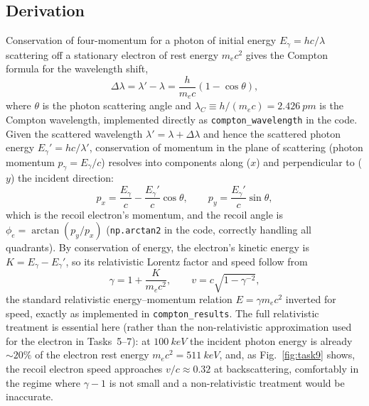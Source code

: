 \documentclass[11pt]{article}
\begin{document}
\subsection{Derivation}
Conservation of four-momentum for a photon of initial energy $E_\gamma=hc/\lambda$ scattering off a stationary electron of rest energy $m_ec^2$ gives the Compton formula for the wavelength shift,
\begin{equation}
\Delta\lambda = \lambda' - \lambda = \frac{h}{m_ec}(1-\cos\theta), \label{eq:compton}
\end{equation}
where $\theta$ is the photon scattering angle and $\lambda_C\equiv h/(m_ec)=\SI{2.426}{pm}$ is the Compton wavelength, implemented directly as \texttt{compton\_wavelength} in the code. Given the scattered wavelength $\lambda'=\lambda+\Delta\lambda$ and hence the scattered photon energy $E_\gamma'=hc/\lambda'$, conservation of momentum in the plane of scattering (photon momentum $p_\gamma=E_\gamma/c$) resolves into components along ($x$) and perpendicular to ($y$) the incident direction:
\begin{equation}
p_x = \frac{E_\gamma}{c}-\frac{E_\gamma'}{c}\cos\theta, \qquad p_y = \frac{E_\gamma'}{c}\sin\theta,
\end{equation}
which is the recoil electron's momentum, and the recoil angle is $\phi_e=\arctan(p_y/p_x)$ (\texttt{np.arctan2} in the code, correctly handling all quadrants). By conservation of energy, the electron's kinetic energy is $K=E_\gamma-E_\gamma'$, so its relativistic Lorentz factor and speed follow from
\begin{equation}
\gamma = 1+\frac{K}{m_ec^2}, \qquad v = c\sqrt{1-\gamma^{-2}}, \label{eq:relativistic_speed}
\end{equation}
the standard relativistic energy--momentum relation $E=\gamma m_ec^2$ inverted for speed, exactly as implemented in \texttt{compton\_results}. The full relativistic treatment is essential here (rather than the non-relativistic approximation used for the electron in Tasks~5--7): at $\SI{100}{keV}$ the incident photon energy is already $\sim20\%$ of the electron rest energy $m_ec^2=\SI{511}{keV}$, and, as Fig.~\ref{fig:task9} shows, the recoil electron speed approaches $v/c\approx0.32$ at backscattering, comfortably in the regime where $\gamma-1$ is not small and a non-relativistic treatment would be inaccurate.
\end{document}
